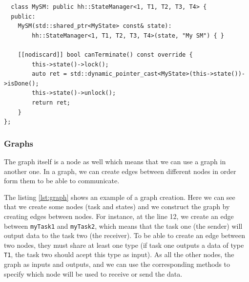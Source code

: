 \begin{listing}[ht!]
\begin{verbatim}
  class MySM: public hh::StateManager<1, T1, T2, T3, T4> {
  public:
    MySM(std::shared_ptr<MyState> const& state):
        hh::StateManager<1, T1, T2, T3, T4>(state, "My SM") { }

    [[nodiscard]] bool canTerminate() const override {
        this->state()->lock();
        auto ret = std::dynamic_pointer_cast<MyState>(this->state())->isDone();
        this->state()->unlock();
        return ret;
    }
};
\end{verbatim}
\label{lst:statemanager}
\end{listing}

\subsubsection{Graphs}

The graph itself is a node as well which means that we can use a graph in
another one. In a graph, we can create edges between different nodes in order
form them to be able to communicate.

The listing \ref{lst:graph} shows an example of a graph creation. Here we can
see that we create some nodes (task and states) and we construct the graph by
creating edges between nodes. For instance, at the line 12, we create an edge
between \texttt{myTask1} and \texttt{myTask2}, which means that the task one
(the sender) will output data to the task two (the receiver). To be able to
create an edge between two nodes, they must share at least one type (if task one
outputs a data of type \texttt{T1}, the task two should acept this type as
input). As all the other nodes, the graph as inputs and outputs, and we can use
the corresponding methods to specify which node will be used to receive or send
the data.

